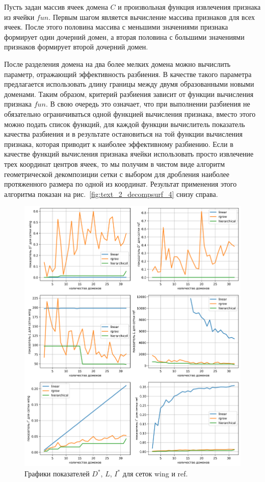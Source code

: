 Пусть задан массив ячеек домена $C$ и произвольная функция извлечения признака из ячейки $fun$.
Первым шагом является вычисление массива признаков для всех ячеек.
После этого половина массива с меньшими значениями признака формирует один дочерний домен, а вторая половина с большими значениями признаков формирует второй дочерний домен.

После разделения домена на два более мелких домена можно вычислить параметр, отражающий эффективность разбиения.
В качестве такого параметра предлагается использовать длину границы между двумя образованными новыми доменами.
Таким образом, критерий разбиения зависит от функции вычисления признака $fun$.
В свою очередь это означает, что при выполнении разбиения не обязательно ограничиваться одной функцией вычисления признака, вместо этого можно подать список функций, для каждой функции вычислитель показатель качества разбиения и в результате остановиться на той функции вычисления признака, которая приводит к наиболее эффективному разбиению.
Если в качестве функций вычисления признака ячейки использовать просто извлечение трех координат центров ячеек, то мы получим в чистом виде алгоритм геометрической декомпозиции сетки с выбором для дробления наиболее протяженного размера по одной из координат.
Результат применения этого алгоритма показан на рис.~\ref{fig:text_2_decompsurf_4} снизу справа.

\begin{figure}[H]
\centering
\includegraphics[width=1.0\textwidth]{fig/par_decompsurf_qual.png}
\singlespacing
{}\caption{Графики показателей $D^{*}$, $L$, $I^{*}$ для сеток wing и ref.}
\label{fig:text_2_decompsurf_qual}
\end{figure}

